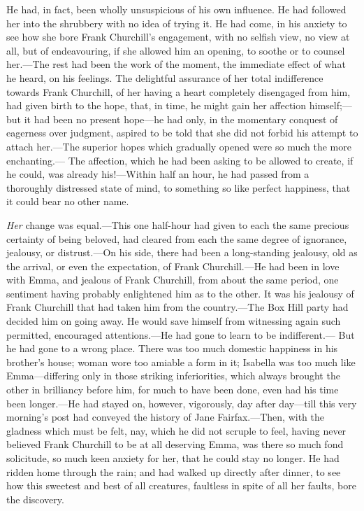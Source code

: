 He had, in fact, been wholly unsuspicious of his own influence.
He had followed her into the shrubbery with no idea of trying it.
He had come, in his anxiety to see how she bore Frank Churchill's
engagement, with no selfish view, no view at all, but of endeavouring,
if she allowed him an opening, to soothe or to counsel her.---The rest
had been the work of the moment, the immediate effect of what he heard,
on his feelings.  The delightful assurance of her total indifference
towards Frank Churchill, of her having a heart completely disengaged
from him, had given birth to the hope, that, in time, he might gain
her affection himself;---but it had been no present hope---he had only,
in the momentary conquest of eagerness over judgment, aspired to be
told that she did not forbid his attempt to attach her.---The superior
hopes which gradually opened were so much the more enchanting.---%
The affection, which he had been asking to be allowed to create,
if he could, was already his!---Within half an hour, he had passed
from a thoroughly distressed state of mind, to something so like
perfect happiness, that it could bear no other name.

\emph{Her} change was equal.---This one half-hour had given to each the
same precious certainty of being beloved, had cleared from each
the same degree of ignorance, jealousy, or distrust.---On his side,
there had been a long-standing jealousy, old as the arrival,
or even the expectation, of Frank Churchill.---He had been in love
with Emma, and jealous of Frank Churchill, from about the same period,
one sentiment having probably enlightened him as to the other.
It was his jealousy of Frank Churchill that had taken him from
the country.---The Box Hill party had decided him on going away.
He would save himself from witnessing again such permitted,
encouraged attentions.---He had gone to learn to be indifferent.---%
But he had gone to a wrong place.  There was too much domestic
happiness in his brother's house; woman wore too amiable a form in it;
Isabella was too much like Emma---differing only in those striking
inferiorities, which always brought the other in brilliancy before him,
for much to have been done, even had his time been longer.---He had
stayed on, however, vigorously, day after day---till this very morning's
post had conveyed the history of Jane Fairfax.---Then, with the
gladness which must be felt, nay, which he did not scruple to feel,
having never believed Frank Churchill to be at all deserving Emma,
was there so much fond solicitude, so much keen anxiety for her,
that he could stay no longer.  He had ridden home through the rain;
and had walked up directly after dinner, to see how this sweetest
and best of all creatures, faultless in spite of all her faults,
bore the discovery.

